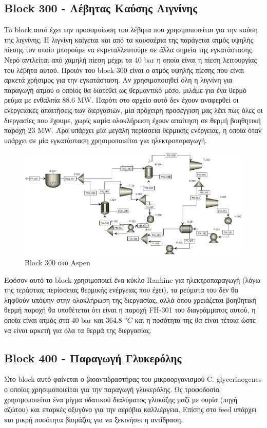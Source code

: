 \documentclass[11pt]{article}
\begin{document}
\subsection{Block 300 - Λέβητας Καύσης Λιγνίνης}
\label{sec:org0fd5382}
To block αυτό έχει την προσομοίωση του λέβητα που χρησιμοποιείται για την καύση της λιγνίνης. Η λιγνίνη καίγεται και από τα καυσαέρια της παράγεται ατμός υψηλής πίεσης τον οποίο μπορούμε να εκμεταλλευτούμε σε άλλα σημεία της εγκατάστασης. Νερό αντλείται από χαμηλή πίεση μέχρι τα 40 bar η οποία είναι η πίεση λειτουργίας του λέβητα αυτού. Προιόν του block 300 είναι ο ατμός υψηλής πίεσης που είναι αρκετά χρήσιμος για την εγκατάσταση. Αν χρησιμοποιηθεί όλη η λιγνίνη για παραγωγή ατμού ο οποίος θα διατεθεί ως θερμαντικό μέσο, μιλάμε για ένα θερμό ρεύμα με ενθαλπία 88.6 MW. Παρότι στο αρχείο αυτό δεν έχουν αναφερθεί οι ενεργειακές απαιτήσεις των διεργασιών, μία πρόχειρη προσέγγιση μας λέει πως όλες οι διεργασίες που έχουμε, χωρίς καμία ολοκλήρωση έχουν απαίτηση σε θερμή βοηθητική παροχή 23 MW. Άρα υπάρχει μία μεγάλη περίσσεια θερμικής ενέργειας, η οποία όταν υπάρχει σε μία εγκατάσταση χρησιμοποιείται για ηλεκτροπαραγωγή.

\begin{figure}[htbp]
\centering
\includegraphics[width=.9\linewidth]{Block_300_-_Λέβητας_Καύσης_Λιγνίνης/2023-03-11_17-09-00_screenshot.png}
\caption{Block 300 στο Aspen}
\end{figure}

Εφόσον αυτό το block χρησιμοποιεί ένα κύκλο Rankine για ηλεκτροπαραγωγή (λόγω της τεράστιας περίσσειας θερμικής ενέργειας που έχει), τα ρεύματα του δεν θα ληφθούν υπόψην στην ολοκλήρωση της διεργασίας, αλλά όπου χρειάζεται βοηθητική θερμή παροχή θα υποθέτεται ότι είναι η παροχή FH-301 του διαγράμματος αυτού, η οποία είναι ατμός στα 40 bar και 364.8 \(^oC\) και η ποσότητα της θα είναι τέτοια ώστε να είναι αρκετή για όλα τα θερμά της διεργασίας.

\subsection{Block 400 - Παραγωγή Γλυκερόλης}
\label{sec:org618f6ea}
Στο block αυτό φαίνεται ο βιοαντιδραστήρας του μικροοργανισμού C. glycerinogenes ο οποίος χρησιμοποιείται για την παραγωγή γλυκερόλης. Ως τροφοδοσία χρησιμοποιείται ένα μίγμα υδατικού διαλύματος γλυκόζης μαζί με ουρία (πηγή αζώτου) και επαρκές οξυγόνο για την αερόβια καλλιέργεια. Επίσης στο feed υπάρχει και μικρή ποσότητα βιομάζας για να ξεκινήσει η αντίδραση.
\end{document}
